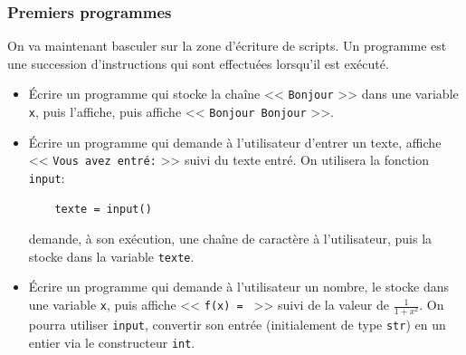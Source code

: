 \begin{frame}[fragile]
	\frametitle{Premiers programmes}
	
	On va maintenant basculer sur la zone d'écriture de scripts. Un programme est une succession d'instructions qui sont effectuées lorsqu'il est exécuté.
	\pause
	
	\begin{exo}
	\begin{itemize}[<+->]
	\item Écrire un programme qui stocke la chaîne << \lstinline|Bonjour| >> dans une variable \lstinline|x|, puis l'affiche, puis affiche << \lstinline|Bonjour Bonjour| >>.
	
	\item Écrire un programme qui demande à l'utilisateur d'entrer un texte, affiche << \lstinline|Vous avez entré:| >> suivi du texte entré. On utilisera la fonction \lstinline|input|:	
	\begin{lstlisting}
	texte = input()
	\end{lstlisting}
	demande, à son exécution, une chaîne de caractère à l'utilisateur, puis la stocke dans la variable \lstinline|texte|.
	
	\item Écrire un programme qui demande à l'utilisateur un nombre, le stocke dans une variable \lstinline|x|, puis affiche << \lstinline|f(x) = | >> suivi de la valeur de $\frac{1}{1+x^2}$. On pourra utiliser \lstinline|input|, convertir son entrée (initialement de type \lstinline|str|) en un entier via le constructeur \lstinline|int|.
	
	\end{itemize}
	\end{exo}
\end{frame}


